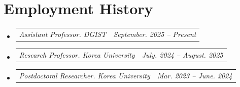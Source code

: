 \documentclass[letterpaper,11pt]{article}
\makeatletter
\newcommand{\resumeSubheadingTwo}[2]{
  \vspace{-2pt}\item
    \begin{tabular*}{1.0\textwidth}[t]{l@{\extracolsep{\fill}}r}
      \textit{#1} & \textit{#2} \\
    \end{tabular*}\vspace{-7pt}
}
\newcommand{\resumeSubheading}[4]{
  \vspace{-2pt}\item
    \begin{tabular*}{1.0\textwidth}[t]{l@{\extracolsep{\fill}}r}
      \textbf{#1} & \textbf{\small #2} \\
      \textit{\small#3} & \textit{\small #4} \\
    \end{tabular*}\vspace{-7pt}
}
\newcommand{\resumeSubHeadingListStart}{\begin{itemize}[leftmargin=0.0in, label={}]}
\newcommand{\resumeSubHeadingListEnd}{\end{itemize}}
\makeatother
\begin{document}
\section{Employment History}
\resumeSubHeadingListStart
\resumeSubheadingTwo
{Assistant Professor. DGIST}{September. 2025 -- Present}\vspace{-10pt}  
\resumeSubheadingTwo
    {Research Professor. Korea University}{July. 2024 -- August. 2025}\vspace{-10pt}  
    \resumeSubheadingTwo
    {Postdoctoral Researcher. Korea University}{Mar. 2023 -- June. 2024}\vspace{-15pt}  
\resumeSubHeadingListEnd


\end{document}
